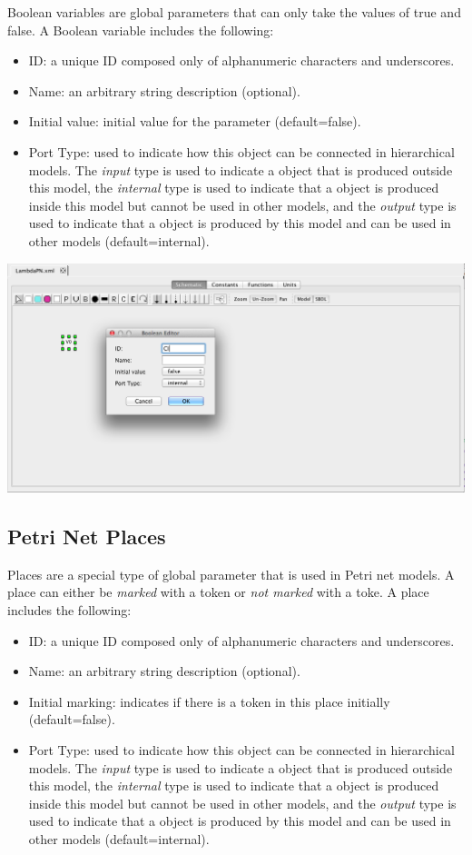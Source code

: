 \documentclass[titlepage,11pt]{article}
\begin{document}
\noindent
Boolean variables are global parameters that can only take the values of true and false.  A Boolean variable includes the following:
\begin{itemize}
\item ID: a unique ID composed only of alphanumeric characters and underscores.
\item Name: an arbitrary string description (optional).
\item Initial value: initial value for the parameter (default=false).
\item Port Type: used to indicate how this object can be connected in hierarchical models.  The \emph{input} type is used to indicate a object that is produced outside this model, the \emph{internal} type is used to indicate that a object is produced inside this model but cannot be used in other models, and the \emph{output} type is used to indicate that a object is produced by this model and can be used in other models (default=internal). 
\end{itemize}

\begin{center}
\includegraphics[width=160mm]{screenshots/Boolean}
\end{center}

\subsection{\label{Places}Petri Net Places}

\noindent
Places are a special type of global parameter that is used in Petri net models.  A place can either be \emph{marked} with a token or \emph{not marked} with a toke.  A place includes the following:
\begin{itemize}
\item ID: a unique ID composed only of alphanumeric characters and underscores.
\item Name: an arbitrary string description (optional).
\item Initial marking: indicates if there is a token in this place initially (default=false).
\item Port Type: used to indicate how this object can be connected in hierarchical models.  The \emph{input} type is used to indicate a object that is produced outside this model, the \emph{internal} type is used to indicate that a object is produced inside this model but cannot be used in other models, and the \emph{output} type is used to indicate that a object is produced by this model and can be used in other models (default=internal). 
\end{itemize}
\end{document}
